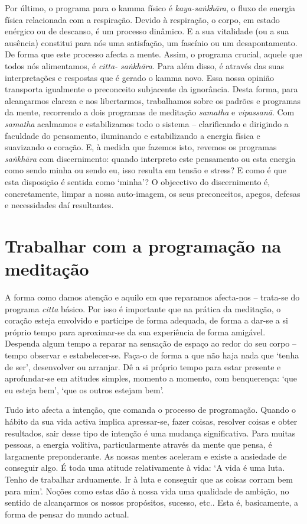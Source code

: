 Por último, o programa para o kamma físico é \emph{kaya-saṅkhāra}, o fluxo de energia física relacionada com a respiração. Devido à respiração, o corpo, em estado enérgico ou de descanso, é um processo dinâmico. E a sua vitalidade (ou a sua ausência) constitui para nós uma satisfação, um fascínio ou um desapontamento. De forma que este processo afecta a mente. Assim, o programa crucial, aquele que todos nós alimentamos, é \emph{citta- saṅkhāra}. Para além disso, é através das suas interpretações e respostas que é gerado o kamma novo. Essa nossa opinião transporta igualmente o preconceito subjacente da ignorância. Desta forma, para alcançarmos clareza e nos libertarmos, trabalhamos sobre os padrões e programas da mente, recorrendo a dois programas de meditação \emph{samatha} e \emph{vipassanā}. Com \emph{samatha} acalmamos e estabilizamos todo o sistema -- clarificando e dirigindo a faculdade do pensamento, iluminando e estabilizando a energia física e suavizando o coração. E, à medida que fazemos isto, revemos os programas \emph{saṅkhāra} com discernimento: quando interpreto este pensamento ou esta energia como sendo minha ou sendo eu, isso resulta em tensão e stress? E como é que esta disposição é sentida como `minha'? O objecctivo do discernimento é, concretamente, limpar a nossa auto-imagem, os seus preconceitos, apegos, defesas e necessidades daí resultantes.

\section{Trabalhar com a programação na meditação}

A forma como damos atenção e aquilo em que reparamos afecta-nos -- trata-se do programa \emph{citta} básico. Por isso é importante que na prática da meditação, o coração esteja envolvido e participe de forma adequada, de forma a dar-se a si próprio tempo para aproximar-se da sua experiência de forma amigável. Despenda algum tempo a reparar na sensação de espaço ao redor do seu corpo -- tempo observar e estabelecer-se. Faça-o de forma a que não haja nada que `tenha de ser', desenvolver ou arranjar. Dê a si próprio tempo para estar presente e aprofundar-se em atitudes simples, momento a momento, com benquerença: `que eu esteja bem', `que os outros estejam bem'.

Tudo isto afecta a intenção, que comanda o processo de programação. Quando o hábito da sua vida activa implica apressar-se, fazer coisas, resolver coisas e obter resultados, sair desse tipo de intenção é uma mudança significativa. Para muitas pessoas, a energia volitiva, particularmente através da mente que pensa, é largamente preponderante. As nossas mentes aceleram e existe a ansiedade de conseguir algo. É toda uma atitude relativamente à vida: `A vida é uma luta. Tenho de trabalhar arduamente. Ir à luta e conseguir que as coisas corram bem para mim'. Noções como estas dão à nossa vida uma qualidade de ambição, no sentido de alcançarmos os nossos propósitos, sucesso, etc.. Esta é, basicamente, a forma de pensar do mundo actual.

